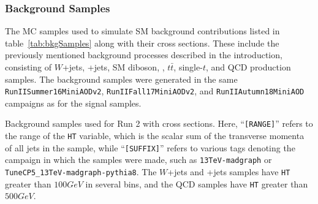 %  

\subsubsection{Background Samples}

The MC samples used to simulate SM background contributions listed in table~\ref{tab:bkgSamples} along with their cross sections. %
These include the previously mentioned background processes described in the introduction, consisting of $W$+jets, \DY+jets, SM diboson, \bbbar, $t\bar{t}$, single-$t$, and QCD production samples.
The background samples were generated in the same \texttt{RunIISummer16MiniAODv2}, \texttt{RunIIFall17MiniAODv2}, and \texttt{RunIIAutumn18MiniAOD} campaigns as for the signal samples.

\begin{table}
  \centering
  
  \caption{
    Background samples used for Run 2 with cross sections.
    Here, ``\texttt{[RANGE]}'' refers to the range of the \texttt{HT} variable, which is the scalar sum of the transverse momenta of all jets in the sample, while ``\texttt{[SUFFIX]}'' refers to various tags denoting the campaign in which the samples were made, such as \texttt{13TeV-madgraph} or \texttt{TuneCP5\_13TeV-madgraph-pythia8}.
    The $W$+jets and \DY+jets samples have \texttt{HT} greater than $100\unit{GeV}$ in several bins, and the QCD samples have \texttt{HT} greater than $500\unit{GeV}$.
  }
  \label{tab:bkgSamples}
\end{table}

%  

%  
